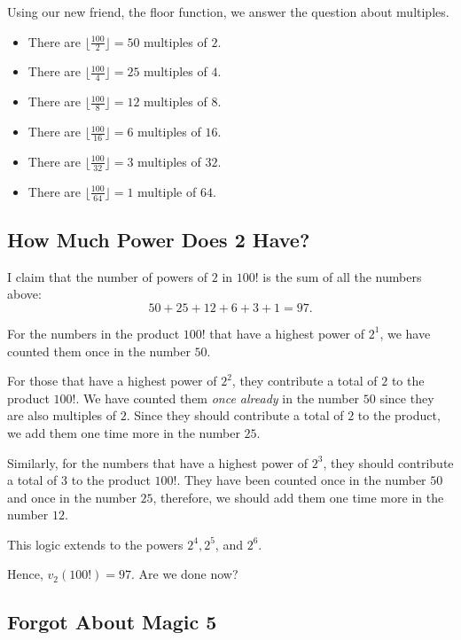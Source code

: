 Using our new friend, the floor function, we answer the question about multiples.
\begin{itemize}  
	\item  There are $\lfloor \frac{100}{2} \rfloor=50$ multiples of $2$.
	\item  There are $\lfloor \frac{100}{4} \rfloor=25$ multiples of $4$.
	\item  There are $\lfloor \frac{100}{8} \rfloor=12$ multiples of $8$.
	\item  There are $\lfloor \frac{100}{16} \rfloor=6$ multiples of $16$.
	\item  There are $\lfloor \frac{100}{32} \rfloor=3$ multiples of $32$.
	\item  There are $\lfloor \frac{100}{64} \rfloor=1$ multiple of $64$.  
\end{itemize}

\subsection*{How Much Power Does 2 Have?}

I claim that the number of powers of $2$ in $100!$ is the sum of all the numbers above: $$50+25+12+6+3+1=97.$$  

For the numbers in the product $100!$ that have a highest power of $2^{1}$, we have counted them once in the number $50$. 

For those that have a highest power of $2^{2}$, they contribute a total of $2$ to the product $100!$. We have counted them \textit{once already} in the number $50$ since they are also multiples of $2$. Since they should contribute a total of $2$ to the product, we add them one time more in the number $25$.  
\clearpage

Similarly, for the numbers that have a highest power of $2^3$, they should contribute a total of $3$ to the product $100!$. They have been counted once in the number $50$ and once in the number $25$, therefore, we should add them one time more in the number $12$.

This logic extends to the powers $2^4, 2^5$, and $2^6$.  

Hence, $v_2(100!)=97$.  Are we done now?

\clearpage

\subsection*{Forgot About Magic 5}

